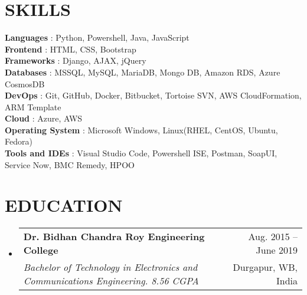 \documentclass[letterpaper,11pt]{article}
\makeatletter
\newcommand{\resumeSubheading}[4]{
  \vspace{-1pt}\item
    \begin{tabular*}{\textwidth}[t]{l@{\extracolsep{\fill}}r}
      \textbf{#1} & {\color{dark-grey}\small #2}\vspace{1pt}\\ %
      \textit{#3} & {\color{dark-grey} \small #4}\\ %
    \end{tabular*}\vspace{-4pt}
}
\newcommand{\resumeSubHeadingListStart}{\begin{itemize}[leftmargin=0in, label={}]}
\newcommand{\resumeSubHeadingListEnd}{\end{itemize}}
\makeatother
\begin{document}
\section{SKILLS}
 \begin{itemize}[leftmargin=0in, label={}]
    \small{\item{
    \textbf{Languages} {: Python, Powershell, Java, JavaScript}\vspace{2pt} \\
    \textbf{Frontend} {: HTML, CSS, Bootstrap}\vspace{2pt} \\
    \textbf{Frameworks} {: Django, AJAX, jQuery}\vspace{2pt} \\
    \textbf{Databases} {: MSSQL, MySQL, MariaDB, Mongo DB, Amazon RDS, Azure CosmosDB}\vspace{2pt} \\
    \textbf{DevOps} {: Git, GitHub, Docker, Bitbucket, Tortoise SVN, AWS CloudFormation, ARM Template}\vspace{2pt} \\
    \textbf{Cloud}     {: Azure, AWS}\vspace{2pt} \\
    \textbf{Operating System} {: Microsoft Windows, Linux(RHEL, CentOS, Ubuntu, Fedora)}\vspace{2pt} \\
    \textbf{Tools and IDEs} {: Visual Studio Code, Powershell ISE, Postman, SoapUI, Service Now, BMC Remedy, HPOO}\vspace{2pt} \\}
    }
 \end{itemize}
 

\section {EDUCATION}
  \resumeSubHeadingListStart
    \resumeSubheading
      {Dr. Bidhan Chandra Roy Engineering College}{Aug. 2015 -- June 2019}
      {Bachelor of Technology in Electronics and Communications Engineering. 8.56 CGPA}{Durgapur, WB, India}
  \resumeSubHeadingListEnd



\end{document}
